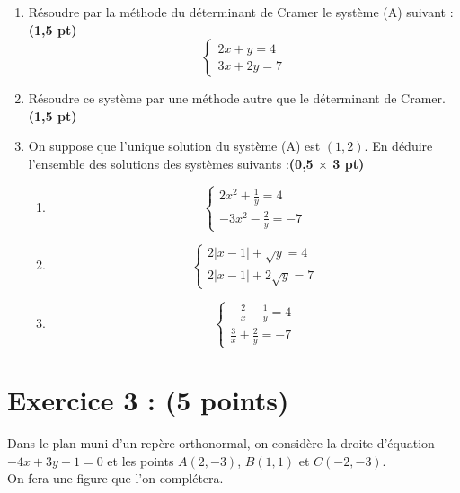 \documentclass{article}
\begin{document}
\begin{enumerate}
    \item Résoudre par la méthode du déterminant de Cramer le système (A) suivant :\textbf{(1,5 pt)}
    \[
    \begin{cases}
    2x + y = 4 \\
    3x + 2y = 7
    \end{cases}
    \]

    \item Résoudre ce système par une méthode autre que le déterminant de Cramer.\textbf{(1,5 pt)}

    \item On suppose que l’unique solution du système (A) est \((1, 2)\). En déduire l’ensemble des solutions des systèmes suivants :\textbf{(0,5 $\times$ 3 pt)}
    \begin{enumerate}
        \item 
        \[
        \begin{cases}
        2x^2 + \frac{1}{y} = 4 \\
        -3x^2 - \frac{2}{y} = -7
        \end{cases}
        \]
        
        \item 
        \[
        \begin{cases}
        2|x - 1| + \sqrt{y} = 4 \\
        2|x - 1| + 2\sqrt{y} = 7
        \end{cases}
        \]
        
        \item 
        \[
        \begin{cases}
        -\frac{2}{x} - \frac{1}{y} = 4 \\
        \frac{3}{x} + \frac{2}{y} = -7
        \end{cases}
        \]
    \end{enumerate}
\end{enumerate}
\section*{Exercice 3 : (5 points)}

Dans le plan muni d’un repère orthonormal, on considère la droite d’équation \(-4x + 3y + 1 = 0\) et les points \(A(2, -3)\), \(B(1, 1)\) et \(C(-2, -3)\).\\
On fera une figure que l’on complétera.
\end{document}
